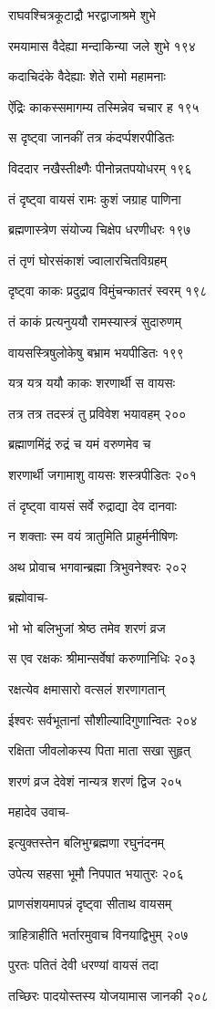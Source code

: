 राघवश्चित्रकूटाद्रौ भरद्वाजाश्रमे शुभे

रमयामास वैदेह्या मन्दाकिन्या जले शुभे १९४

कदाचिदंके वैदेह्याः शेते रामो महामनाः

ऐंद्रिः काकस्समागम्य तस्मिन्नेव चचार ह १९५

स दृष्ट्वा जानकीं तत्र कंदर्प्पशरपीडितः

विददार नखैस्तीक्ष्णैः पीनोन्नतपयोधरम् १९६

तं दृष्ट्वा वायसं रामः कुशं जग्राह पाणिना

ब्रह्मणास्त्रेण संयोज्य चिक्षेप धरणीधरः १९७

तं तृणं घोरसंकाशं ज्वालारचितविग्रहम्

दृष्ट्वा काकः प्रदुद्राव विमुंचन्कातरं स्वरम् १९८

तं काकं प्रत्यनुययौ रामस्यास्त्रं सुदारुणम्

वायसस्त्रिषुलोकेषु बभ्राम भयपीडितः १९९

यत्र यत्र ययौ काकः शरणार्थी स वायसः

तत्र तत्र तदस्त्रं तु प्रविवेश भयावहम् २००

ब्रह्माणमिंद्रं रुद्रं च यमं वरुणमेव च

शरणार्थी जगामाशु वायसः शस्त्रपीडितः २०१

तं दृष्ट्वा वायसं सर्वे रुद्राद्या देव दानवाः

न शक्ताः स्म वयं त्रातुमिति प्राहुर्मनीषिणः

अथ प्रोवाच भगवान्ब्रह्मा त्रिभुवनेश्वरः २०२

ब्रह्मोवाच-

भो भो बलिभुजां श्रेष्ठ तमेव शरणं व्रज

स एव रक्षकः श्रीमान्सर्वेषां करुणानिधिः २०३

रक्षत्येव क्षमासारो वत्सलं शरणागतान्

ईश्वरः सर्वभूतानां सौशील्यादिगुणान्वितः २०४

रक्षिता जीवलोकस्य पिता माता सखा सुहृत्

शरणं व्रज देवेशं नान्यत्र शरणं द्विज २०५

महादेव उवाच-

इत्युक्तस्तेन बलिभुग्ब्रह्मणा रघुनंदनम्

उपेत्य सहसा भूमौ निपपात भयातुरः २०६

प्राणसंशयमापन्नं दृष्ट्वा सीताथ वायसम्

त्राहित्राहीति भर्तारमुवाच विनयाद्विभुम् २०७

पुरतः पतितं देवी धरण्यां वायसं तदा

तच्छिरः पादयोस्तस्य योजयामास जानकी २०८

